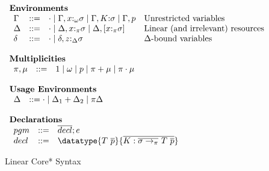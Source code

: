 \begin{figure}[h]
\begin{framed}
\[\begin{array}{l}
\begin{array}{lcll}
\end{array}\\\\
%
\textbf{Environments}\\
\begin{array}{lcll}
  \Gamma   & ::=  & \cdot \mid \Gamma,x{:}_\omega\sigma \mid \Gamma,K{:}\sigma \mid \Gamma,p & \textrm{Unrestricted variables} \\
  \Delta   & ::=  & \cdot \mid \Delta,x{:}_\pi\sigma \mid \Delta,[x{:}_\pi\sigma] & \textrm{Linear (and irrelevant) resources} \\
  \delta   & ::=  & \cdot \mid \delta,z{:}_{\Delta}\sigma & \textrm{$\Delta$-bound variables}\\
\end{array}\\\\
%
\textbf{Multiplicities}\\
\begin{array}{lcll}
  \pi, \mu & ::= & 1 \mid \omega \mid p \mid \pi + \mu \mid \pi \cdot \mu\\
\end{array}\\\\
%
\textbf{Usage Environments}\\
\begin{array}{lcl}
  \Delta & ::= \cdot\mid\Delta_1+\Delta_2\mid\pi\Delta\\
\end{array}\\\\
%
\textbf{Declarations}\\
\begin{array}{lcl}
  pgm & ::= & \overline{decl}; e \\
  decl & ::= & \datatype{T~\overline{p}}{\overline{K:\overline{\sigma \to_\pi}~T~\overline{p}}}
\end{array}
%
\end{array}
\]
\end{framed}
\caption{Linear Core* Syntax}
\label{linear-core-syntax}
\end{figure}

